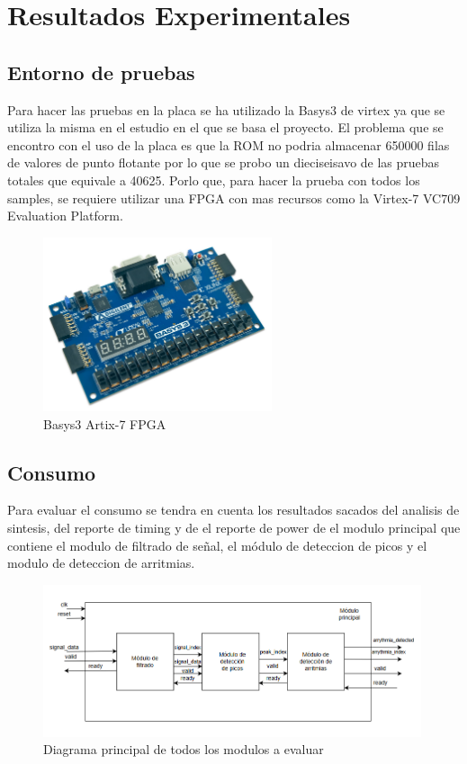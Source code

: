 \chapter{Resultados Experimentales}


\section{Entorno de pruebas}
Para hacer las pruebas en la placa se ha utilizado la Basys3 de virtex ya que se utiliza la misma en el estudio en el que se basa el proyecto.
El problema que se encontro con el uso de la placa es que la ROM no podria almacenar 650000 filas de valores de punto flotante por lo que se probo un dieciseisavo de las pruebas totales que equivale a 40625.
Porlo que, para hacer la prueba con todos los samples, se requiere utilizar una FPGA con mas recursos como la Virtex-7 VC709 Evaluation Platform.

\begin{figure}[h]
	\centering
	\includegraphics[width=0.6\textwidth]{./Images/img_introduccion/Basys3.jpg}
	\caption{Basys3 Artix-7 FPGA}
	\label{fig:Basys3}
\end{figure}

\section{Consumo}
	Para evaluar el consumo se tendra en cuenta los resultados sacados del analisis de sintesis, del reporte de timing y de el reporte de power de el modulo principal que contiene el modulo de filtrado de señal,
	el módulo de deteccion de picos y el modulo de deteccion de arritmias. 
	
	\begin{figure}[h!]
		\centering
		\includegraphics[width=0.99\textwidth]{./Images/img_res_experimentales/diagramaGeneral.png}
		\caption{Diagrama principal de todos los modulos a evaluar}
		\label{fig:Diagramaasmfiltrado}
	\end{figure} 

